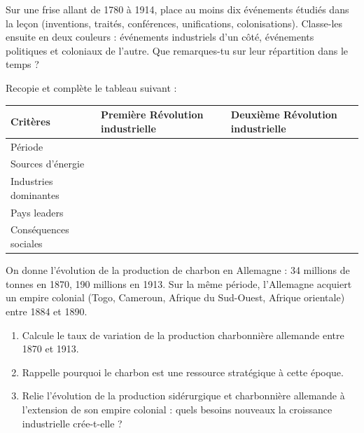 \documentclass[11pt]{article}
\newcounter{popsec}
\newcounter{popsub}
\newcommand{\courssub}[1]{%
  \stepcounter{popsub}%
  \par\vspace{9pt}\noindent{\popxbold\fontsize{11.5}{13}\selectfont\color{popink}{\color{poporange}\thepopsec.\thepopsub}\hspace{6pt}#1}\par\nopagebreak\vspace{4pt}
}
\begin{document}
\courssub{Je m'entraîne}

\begin{exercice}
Sur une frise allant de 1780 à 1914, place au moins dix événements étudiés dans la leçon (inventions, traités, conférences, unifications, colonisations). Classe-les ensuite en deux couleurs : événements industriels d'un côté, événements politiques et coloniaux de l'autre. Que remarques-tu sur leur répartition dans le temps ?
\end{exercice}

\begin{exercice}
Recopie et complète le tableau suivant :
\begin{center}
\begin{tabularx}{\linewidth}{|l|X|X|}\hline
\rowcolor{popblueL} Critères & Première Révolution industrielle & Deuxième Révolution industrielle \\ \hline
Période & & \\ \hline
Sources d'énergie & & \\ \hline
Industries dominantes & & \\ \hline
Pays leaders & & \\ \hline
Conséquences sociales & & \\ \hline
\end{tabularx}
\end{center}
\end{exercice}

\begin{exercice}
On donne l'évolution de la production de charbon en Allemagne : 34 millions de tonnes en 1870, 190 millions en 1913. Sur la même période, l'Allemagne acquiert un empire colonial (Togo, Cameroun, Afrique du Sud-Ouest, Afrique orientale) entre 1884 et 1890.
\begin{enumerate}
\item Calcule le taux de variation de la production charbonnière allemande entre 1870 et 1913.
\item Rappelle pourquoi le charbon est une ressource stratégique à cette époque.
\item Relie l'évolution de la production sidérurgique et charbonnière allemande à l'extension de son empire colonial : quels besoins nouveaux la croissance industrielle crée-t-elle ?
\end{enumerate}
\end{exercice}
\end{document}
